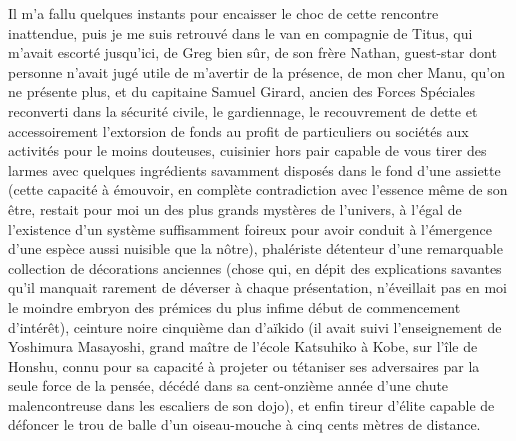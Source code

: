 Il m’a fallu quelques instants pour encaisser le choc de cette rencontre inattendue, puis je me suis retrouvé dans le van en compagnie de Titus, qui m’avait escorté jusqu’ici, de Greg bien sûr, de son frère Nathan, guest-star dont personne n’avait jugé utile de m’avertir de la présence, de mon cher Manu, qu’on ne présente plus, et du capitaine Samuel Girard, ancien des Forces Spéciales reconverti dans la sécurité civile, le gardiennage, le recouvrement de dette et accessoirement l’extorsion de fonds au profit de particuliers ou sociétés aux activités pour le moins douteuses, cuisinier hors pair capable de vous tirer des larmes avec quelques ingrédients savamment disposés dans le fond d’une assiette (cette capacité à émouvoir, en complète contradiction avec l’essence même de son être, restait pour moi un des plus grands mystères de l’univers, à l’égal de l’existence d’un système suffisamment foireux pour avoir conduit à l’émergence d’une espèce aussi nuisible que la nôtre), phalériste détenteur d’une remarquable collection de décorations anciennes (chose qui, en dépit des explications savantes qu’il manquait rarement de déverser à chaque présentation, n’éveillait pas en moi le moindre embryon des prémices du plus infime début de commencement d’intérêt), ceinture noire cinquième dan d’aïkido (il avait suivi l’enseignement de Yoshimura Masayoshi, grand maître de l’école Katsuhiko à Kobe, sur l’île de Honshu, connu pour sa capacité à projeter ou tétaniser ses adversaires par la seule force de la pensée, décédé dans sa cent-onzième année d’une chute malencontreuse dans les escaliers de son dojo), et enfin tireur d’élite capable de défoncer le trou de balle d’un oiseau-mouche à cinq cents mètres de distance.


